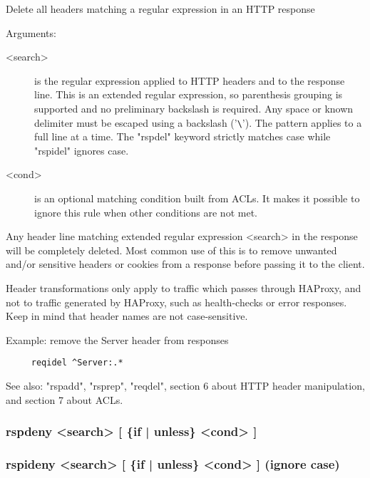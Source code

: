 
  Delete all headers matching a regular expression in an HTTP response


  Arguments:
  \begin{description}
  \item[<search>] is the regular expression applied to HTTP headers and to the
              response line. This is an extended regular expression, so
              parenthesis grouping is supported and no preliminary backslash
              is required. Any space or known delimiter must be escaped using
              a backslash ('\verb|\|'). The pattern applies to a full line at a time.
              The "rspdel" keyword strictly matches case while "rspidel"
              ignores case.

  \item[<cond>] is an optional matching condition built from ACLs. It makes it
              possible to ignore this rule when other conditions are not met.
  \end{description}

  Any header line matching extended regular expression <search> in the response
  will be completely deleted. Most common use of this is to remove unwanted
  and/or sensitive headers or cookies from a response before passing it to the
  client.

  Header transformations only apply to traffic which passes through HAProxy,
  and not to traffic generated by HAProxy, such as health-checks or error
  responses. Keep in mind that header names are not case-sensitive.

  Example: remove the Server header from responses
  \begin{verbatim}
     reqidel ^Server:.*
  \end{verbatim}

  See also: "rspadd", "rsprep", "reqdel", section 6 about HTTP header
            manipulation, and section 7 about ACLs.

\subsubsection[rspdeny] {rspdeny <search> [ \{if | unless\} <cond> ]}
\subsubsection[rspideny] {rspideny <search> [ \{if | unless\} <cond> ] (ignore case)}

